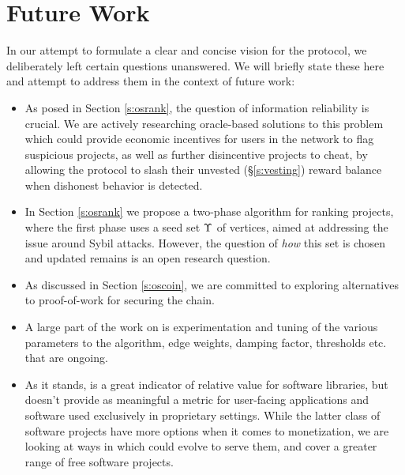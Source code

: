 \section{Future Work}
\label{s:future-work}

In our attempt to formulate a clear and concise vision for the \oscoin{}
protocol, we deliberately left certain questions unanswered. We will
briefly state these here and attempt to address them in the context of future work:

\begin{itemize}
\item As posed in Section \ref{s:osrank}, the question of information
reliability is crucial.  We are actively researching oracle-based solutions to
this problem which could provide economic incentives for users in the network
to flag suspicious projects, as well as further disincentive projects to cheat,
by allowing the protocol to slash their unvested (\S\ref{s:vesting}) reward
balance when dishonest behavior is detected.

\item In Section \ref{s:osrank} we propose a two-phase \osrank{} algorithm for
ranking projects, where the first phase uses a seed set $\Upsilon$ of vertices,
aimed at addressing the issue around Sybil attacks.  However, the question of
\emph{how} this set is chosen and updated remains is an open research question.

\item As discussed in Section \ref{s:oscoin}, we are committed to exploring
alternatives to proof-of-work for securing the chain.

\item A large part of the work on \osrank{} is experimentation and tuning of the
various parameters to the algorithm, \eg edge weights, damping factor, thresholds
etc. that are ongoing.

\item As it stands, \osrank{} is a great indicator of relative value
for software libraries, but doesn't provide as meaningful a metric for
user-facing applications and software used exclusively in proprietary settings.
While the latter class of software projects have more options when it comes to
monetization, we are looking at ways in which \osrank{} could evolve to serve
them, and cover a greater range of free software projects.

\end{itemize}
